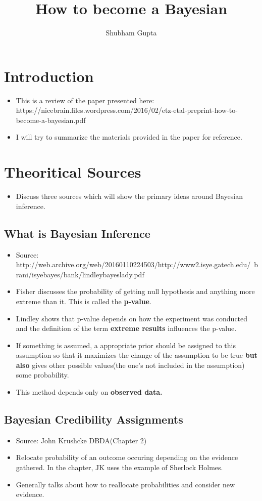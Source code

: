 \documentclass[a4paper]{article}
\title{How to become a Bayesian}
\author{Shubham Gupta}
\begin{document}
\maketitle
\section{Introduction}
\begin{itemize}
    \item This is a review of the paper presented here: https://nicebrain.files.wordpress.com/2016/02/etz-etal-preprint-how-to-become-a-bayesian.pdf
    \item I will try to summarize the materials provided in the paper for reference.
\end{itemize}
\section{Theoritical Sources}
\begin{itemize}
    \item Discuss three sources which will show the primary ideas around Bayesian inference.
\end{itemize}
\subsection{What is Bayesian Inference}
\begin{itemize}
    \item Source: http://web.archive.org/web/20160110224503/http://www2.isye.gatech.edu/~brani/isyebayes/bank/lindleybayeslady.pdf
    \item Fisher discusses the probability of getting null hypothesis and anything more extreme than it. This is called the \textbf{p-value}.  
    \item Lindley shows that p-value depends on how the experiment was conducted and the definition of the term \textbf{extreme results} influences the p-value. 
    \item If something is assumed, a appropriate prior should be assigned to this assumption so that it maximizes the change of the assumption to be true \textbf{but also} gives other possible values(the one's not included in the assumption) some probability. 
    \item This method depends only on \textbf{observed data.}  
\end{itemize}
\subsection{Bayesian Credibility Assignments}
\begin{itemize}
    \item Source: John Krushcke DBDA(Chapter 2)
    \item Relocate probability of an outcome occuring depending on the evidence gathered. In the chapter, JK uses the example of Sherlock Holmes.
    \item Generally talks about how to reallocate probabilities and consider new evidence. 
\end{itemize}
\end{document}
